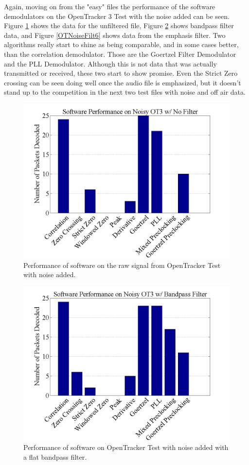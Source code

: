 Again, moving on from the "easy" files the performance of the software demodulators on the OpenTracker 3 Test with the noise added can be seen. Figure \ref{OTNoiseFiltNo} shows the data for the unfiltered file, Figure \ref{OTNoiseFilt0} shows bandpass filter data, and Figure \ref{OTNoiseFilt6} shows data from the emphasis filter. Two algorithms really start to shine as being comparable, and in some cases better, than the correlation demodulator. Those are the Goertzel Filter Demodulator and the PLL Demodulator. Although this is not data that was actually transmitted or received, these two start to show promise. Even the Strict Zero crossing can be seen doing well once the audio file is emphasized, but it doesn't stand up to the competition in the next two test files with noise and off air data.

\begin{figure}
  \centering
	\includegraphics[width=0.75\linewidth]{images/SoftwarePerformanceonNoisyOT3wNoFilter.png} 
	\caption{Performance of software on the raw signal from OpenTracker Test with noise added.}
   \label{OTNoiseFiltNo}
\end{figure}
\begin{figure}
  \centering
	\includegraphics[width=0.75\linewidth]{images/SoftwarePerformanceonNoisyOT3wBandpassFilter.png} 
	\caption{Performance of software on OpenTracker Test with noise added with a flat bandpass filter.}
   \label{OTNoiseFilt0}
\end{figure}
